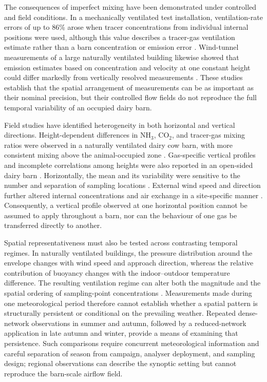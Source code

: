 \documentclass[12pt,a4paper]{article}
\begin{document}
The consequences of imperfect mixing have been demonstrated under controlled
and field conditions. In a mechanically ventilated test installation,
ventilation-rate errors of up to 86\% arose when tracer concentrations from
individual internal positions were used, although this value describes a
tracer-gas ventilation estimate rather than a barn concentration or emission
error \citep{VanBuggenhout2009}. Wind-tunnel measurements of a large naturally
ventilated building likewise showed that emission estimates based on
concentration and velocity at one constant height could differ markedly from
vertically resolved measurements \citep{Janke2020}. These studies establish
that the spatial arrangement of measurements can be as important as their
nominal precision, but their controlled flow fields do not reproduce the full
temporal variability of an occupied dairy barn.

Field studies have identified heterogeneity in both horizontal and vertical
directions. Height-dependent differences in \(\mathrm{NH_3}\),
\(\mathrm{CO_2}\), and tracer-gas mixing ratios were observed in a naturally
ventilated dairy cow barn, with more consistent mixing above the
animal-occupied zone \citep{Mendes2015}. Gas-specific vertical profiles and
incomplete correlations among heights were also reported in an open-sided
dairy barn \citep{Durso2024}. Horizontally, the mean and its variability were
sensitive to the number and separation of sampling locations
\citep{Durso2022}. External wind speed and direction further altered internal
concentrations and air exchange in a site-specific manner
\citep{Saha2013}. Consequently, a vertical profile observed at one horizontal
position cannot be assumed to apply throughout a barn, nor can the behaviour
of one gas be transferred directly to another.

Spatial representativeness must also be tested across contrasting temporal
regimes. In naturally ventilated buildings, the pressure distribution around
the envelope changes with wind speed and approach direction, whereas the
relative contribution of buoyancy changes with the indoor--outdoor temperature
difference. The resulting ventilation regime can alter both the magnitude and
the spatial ordering of sampling-point concentrations \citep{Saha2013}.
Measurements made during one meteorological period therefore cannot establish
whether a spatial pattern is structurally persistent or conditional on the
prevailing weather. Repeated dense-network observations in summer and autumn,
followed by a reduced-network application in late autumn and winter, provide a
means of examining that persistence. Such comparisons require concurrent
meteorological information and careful separation of season from campaign,
analyser deployment, and sampling design; regional observations can describe
the synoptic setting but cannot reproduce the barn-scale airflow field.
\end{document}
